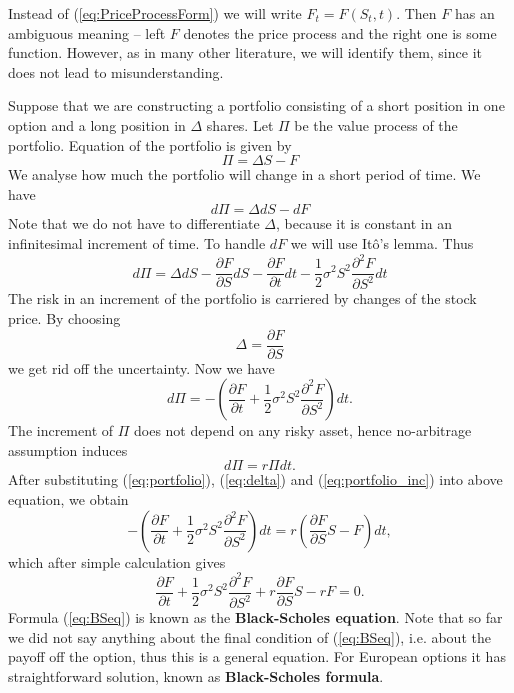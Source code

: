 \documentclass[a4paper,11pt, twoside]{book}
\theoremstyle{definition}
\theoremstyle{remark}
\begin{document}
Instead of (\ref{eq:PriceProcessForm}) we will write $F_t = F(S_t, t)$. Then $F$ has an ambiguous meaning -- left $F$ denotes the price process and the right one is some function. However, as in many other literature, we will identify them, since it does not lead to misunderstanding.

Suppose that we are constructing a portfolio consisting of a short position in one option and a long position in $\Delta$ shares. Let $\Pi$ be the value process of the portfolio. Equation of the portfolio is given by
\begin{equation}
 \label{eq:portfolio}
  \Pi = \Delta S - F 
\end{equation}
We analyse how much the portfolio will change in a short period of time. We have
\[ d\Pi = \Delta dS - dF  \]
Note that we do not have to differentiate $\Delta$, because it is constant in an infinitesimal increment of time. To handle $dF$ we will use It\^{o}'s lemma. Thus
\[ d\Pi = \Delta dS - \frac{\partial F}{\partial S}dS - \frac{\partial F}{\partial t}dt - \frac{1}{2}\sigma^2 S^2 \frac{\partial^2 F}{\partial S^2}dt  \]
The risk in an increment of the portfolio is carriered by changes of the stock price. By choosing
\begin{equation}
 \label{eq:delta}
 \Delta = \frac{\partial F}{\partial S}
\end{equation}
we get rid off the uncertainty. Now we have
\begin{equation}
  \label{eq:portfolio_inc}
 d\Pi = -(\frac{\partial F}{\partial t} + \frac{1}{2}\sigma^2 S^2 \frac{\partial^2 F}{\partial S^2})dt.
\end{equation}
The increment of $\Pi$ does not depend on any risky asset, hence no-arbitrage assumption induces
\[ d\Pi = r\Pi dt. \]
After substituting (\ref{eq:portfolio}), (\ref{eq:delta}) and (\ref{eq:portfolio_inc}) into above equation, we obtain
\[ -(\frac{\partial F}{\partial t} + \frac{1}{2}\sigma^2 S^2 \frac{\partial^2 F}{\partial S^2})dt = r(\frac{\partial F}{\partial S} S - F)dt, \]
which after simple calculation gives
\begin{equation}
 \label{eq:BSeq}
 \frac{\partial F}{\partial t} + \frac{1}{2}\sigma^2 S^2 \frac{\partial^2 F}{\partial S^2} + r\frac{\partial F}{\partial S} S - rF = 0.
\end{equation}
Formula (\ref{eq:BSeq}) is known as the \textbf{Black-Scholes equation}. Note that so far we did not say anything about the final condition of (\ref{eq:BSeq}), i.e. about the payoff off the option, thus this is a general equation. For European options it has straightforward solution, known as \textbf{Black-Scholes formula}.
\end{document}
